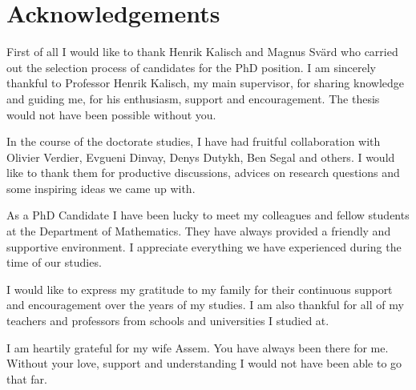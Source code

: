 \chapter{Acknowledgements}

First of all I would like to thank Henrik Kalisch and Magnus Sv\"ard who carried out the selection process of candidates for the PhD position. I am sincerely thankful to Professor Henrik Kalisch, my main supervisor, for sharing knowledge and guiding me, for his enthusiasm, support and encouragement. The thesis would not have been possible without you.


In the course of the doctorate studies, I have had fruitful collaboration with Olivier Verdier, Evgueni Dinvay, Denys Dutykh, Ben Segal and others. I would like to thank them for productive discussions, advices on research questions and some inspiring ideas we came up with.


As a PhD Candidate I have been lucky to meet my colleagues and fellow students at the Department of Mathematics. They have always provided a friendly and supportive environment. I appreciate everything we have experienced during the time of our studies.


I would like to express my gratitude to my family for their continuous support and encouragement over the years of my studies. I am also thankful for all of my teachers and professors from schools and universities I studied at. 


I am heartily grateful for my wife Assem. You have always been there for me. Without your love, support and understanding I would not have been able to go that far. 